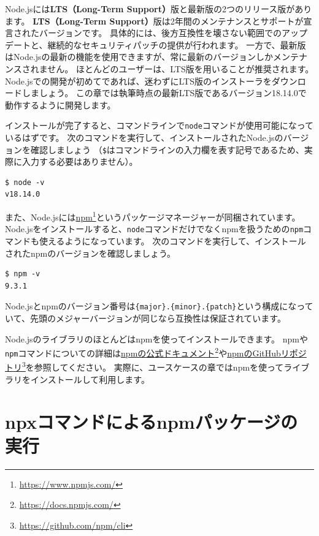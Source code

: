 Node.jsには\textbf{LTS（Long-Term
Support）}版と最新版の2つのリリース版があります。 \textbf{LTS（Long-Term
Support）}版は2年間のメンテナンスとサポートが宣言されたバージョンです。
具体的には、後方互換性を壊さない範囲でのアップデートと、継続的なセキュリティパッチの提供が行われます。
一方で、最新版はNode.jsの最新の機能を使用できますが、常に最新のバージョンしかメンテナンスされません。
ほとんどのユーザーは、LTS版を用いることが推奨されます。Node.jsでの開発が初めてであれば、迷わずにLTS版のインストーラをダウンロードしましょう。
この章では執筆時点の最新LTS版であるバージョン18.14.0で動作するように開発します。

インストールが完了すると、コマンドラインで\texttt{node}コマンドが使用可能になっているはずです。
次のコマンドを実行して、インストールされたNode.jsのバージョンを確認しましょう
（\texttt{\$}はコマンドラインの入力欄を表す記号であるため、実際に入力する必要はありません）。

\begin{lstlisting}
$ node -v
v18.14.0
\end{lstlisting}

また、Node.jsには\href{https://www.npmjs.com/}{npm}\footnote{\url{https://www.npmjs.com/}}というパッケージマネージャーが同梱されています。
Node.jsをインストールすると、\texttt{node}コマンドだけでなくnpmを扱うための\texttt{npm}コマンドも使えるようになっています。
次のコマンドを実行して、インストールされたnpmのバージョンを確認しましょう。

\begin{lstlisting}
$ npm -v
9.3.1
\end{lstlisting}

Node.jsとnpmのバージョン番号は\texttt{\{major\}.\{minor\}.\{patch\}}という構成になっていて、先頭のメジャーバージョンが同じなら互換性は保証されています。

Node.jsのライブラリのほとんどはnpmを使ってインストールできます。
npmや\texttt{npm}コマンドについての詳細は\href{https://docs.npmjs.com/}{npmの公式ドキュメント}\footnote{\url{https://docs.npmjs.com/}}や\href{https://github.com/npm/cli}{npmのGitHubリポジトリ}\footnote{\url{https://github.com/npm/cli}}を参照してください。
実際に、ユースケースの章ではnpmを使ってライブラリをインストールして利用します。

\hypertarget{npx-execution}{%
\section{npxコマンドによるnpmパッケージの実行}\label{npx-execution}}

